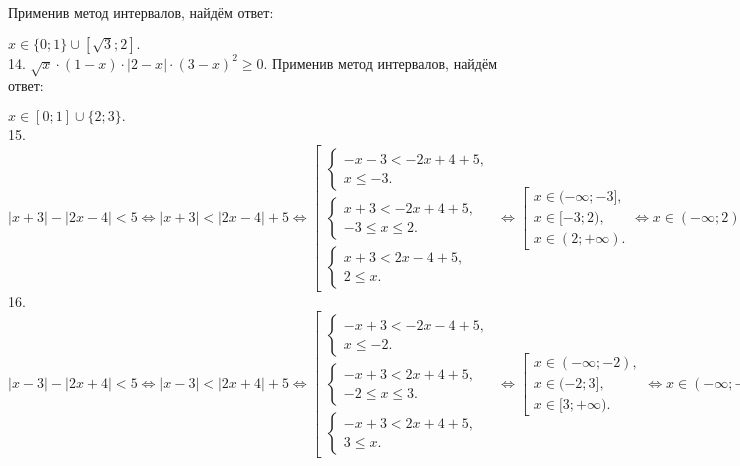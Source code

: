 Применив метод интервалов, найдём ответ:
\begin{figure}[ht!]
\end{figure}
$x\in\{0; 1\}\cup[\sqrt{3};2].$\\
14. $\sqrt{x}\cdot(1-x)\cdot|2-x|\cdot(3-x)^2\geqslant0.$
Применив метод интервалов, найдём ответ:
\begin{figure}[ht!]
\end{figure}
$x\in[0;1]\cup\{2; 3\}.$\\
15. $|x+3|-|2x-4|<5\Leftrightarrow |x+3|<|2x-4|+5 \Leftrightarrow \left[\begin{array}{l}\begin{cases} -x-3<-2x+4+5,\\ x\leqslant -3.\end{cases}\\
\begin{cases} x+3<-2x+4+5,\\ -3\leqslant x\leqslant 2 .\end{cases}\\\begin{cases} x+3<2x-4+5,\\ 2\leqslant x.\end{cases}\end{array}\right.\Leftrightarrow
\left[\begin{array}{l}
x\in(-\infty;-3],\\
x\in[-3;2),\\
x\in(2;+\infty).\end{array}\right.\Leftrightarrow x\in(-\infty;2)\cup(2;+\infty)$\\
16. $|x-3|-|2x+4|<5\Leftrightarrow |x-3|<|2x+4|+5 \Leftrightarrow \left[\begin{array}{l}\begin{cases} -x+3<-2x-4+5,\\ x\leqslant -2.\end{cases}\\
\begin{cases} -x+3<2x+4+5,\\ -2\leqslant x\leqslant 3 .\end{cases}\\\begin{cases} -x+3<2x+4+5,\\ 3\leqslant x.\end{cases}\end{array}\right.\Leftrightarrow
\left[\begin{array}{l}
x\in(-\infty;-2),\\
x\in(-2;3],\\
x\in[3;+\infty).\end{array}\right.\Leftrightarrow x\in(-\infty;-2)\cup(-2;+\infty)$\\
